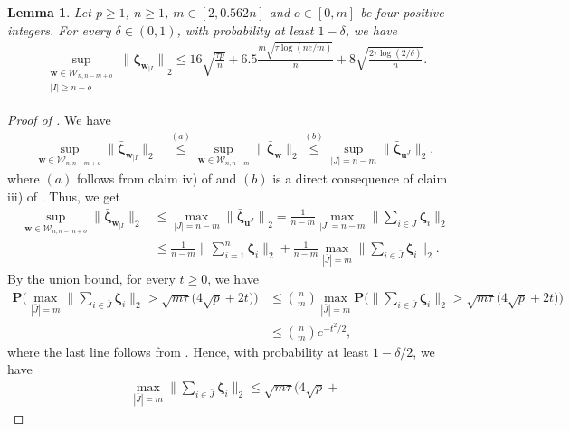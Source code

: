 \documentclass[aos,preprint,reqno]{imsart}
\newcommand\bzeta{\boldsymbol\zeta}
\newcommand\bfP{\mathbf P}
\newcommand\bu{\boldsymbol u}
\newcommand\bw{\boldsymbol w}
\theoremstyle{plain}
\newtheorem{lemma}{Lemma}
\theoremstyle{remark}
\begin{document}
	\begin{lemma}\label{lemma2bis}
	Let $p\ge 1$, $n\ge 1$, $m\in[2,0.562n]$ and $o\in [0, m]$ 
	be four positive integers. For every $\delta\in(0,1)$, with
	probability at least $1-\delta$, we have
	\begin{align}
		\sup_{\substack{\bw\in \mathcal W_{n,n-m+o} \\ 
		|I| \ge n-o}}{\|\bar{\bzeta}_{\bw_{|I}}\|}_2  
		\le 16\sqrt{\frac{\tau p}{n}} + 
		6.5\frac{m\sqrt{\tau\log(ne/m)}}{n} + 
		8\sqrt{\frac{2\tau\log(2/\delta)}{n}}.
	\end{align}
	\end{lemma}
    \begin{proof}[Proof of ] 
	We have
	\begin{align}
		\sup_{\bw\in \mathcal W_{n,n-m+o}}\|\bar{\bzeta}_{\bw_{|I}}\|_2 
			& \stackrel{(a)}{\le} \sup_{\bw\in \mathcal W_{n,n-m}}
			    \|\bar{\bzeta}_{\bw}\|_2\stackrel{(b)}{\le}
			    \sup_{|J| = n-m}\big\|\bar{\bzeta}_{\bu^{J}}\big\|_2,
			\label{eq:L21}
	\end{align}
	where $(a)$ follows from claim iv)  of  and $(b)$ is 
	a direct consequence of claim iii) of . Thus, we get
	\begin{align}
		\sup_{\bw\in \mathcal W_{n,n-m+o}}
		\|\bar{\bzeta}_{\bw_{|I}}\|_2
		&\le  \max_{|J| = n-m} 
			{\big\|\bar{\bzeta}_{\bu^{J}}\big\|}_2
			= \frac1{n-m}\max_{|J| = n-m}  
			\bigg\|\sum_{i\in J} \bzeta_i\bigg\|_2\\
		&\le \frac1{n-m}
			\bigg\|\sum_{i=1}^n \bzeta_i\bigg\|_2 + 
			\frac1{n-m}\max_{|\bar J| = m}  
			\bigg\|\sum_{i\in \bar J} \bzeta_i\bigg\|_2.\label{eq:L22bis}
	\end{align}
    By the union bound, for every $t\ge 0$, we have
	\begin{align}
		\bfP\bigg(\max_{|\bar J| = m}  \bigg\|\sum_{i\in \bar  J} 
			\bzeta_i\bigg\|_2> \sqrt{m\tau}\big(4\sqrt{p} + 2t\big)\bigg) 
		&\le {{n}\choose{m}} \max_{|\bar J| = m} \bfP\bigg( \bigg\| 
			\sum_{i\in\bar J} \bzeta_i\bigg\|_2 > \sqrt{m\tau}
			\big(4\sqrt{p} + 2t\big) \bigg)\\
		&\le {{n}\choose{m}} e^{-t^2/2},
	\end{align}
	where the last line follows from . Hence, with probability
	at least $1-\delta/2$, we have
	\begin{align}\label{lem9:eq1}
	    \max_{|\bar J| = m}  \bigg\|\sum_{i\in \bar  J} 
			\bzeta_i\bigg\|_2 \le \sqrt{m\tau}\big(4\sqrt{p} + 

\end{align}
\end{proof}
\end{document}
